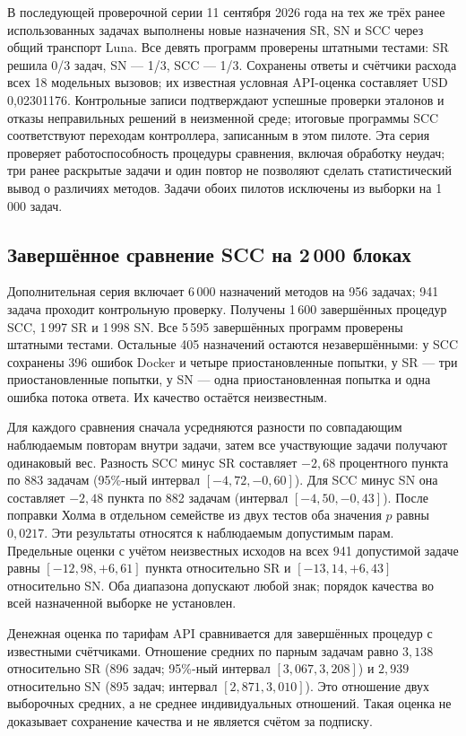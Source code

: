 В последующей проверочной серии 11 сентября 2026 года на тех же трёх ранее использованных задачах выполнены новые назначения SR, SN и SCC через общий транспорт Luna. Все девять программ проверены штатными тестами: SR решила 0/3 задач, SN --- 1/3, SCC --- 1/3. Сохранены ответы и счётчики расхода всех 18 модельных вызовов; их известная условная API-оценка составляет USD 0{,}02301176. Контрольные записи подтверждают успешные проверки эталонов и отказы неправильных решений в неизменной среде; итоговые программы SCC соответствуют переходам контроллера, записанным в этом пилоте. Эта серия проверяет работоспособность процедуры сравнения, включая обработку неудач; три ранее раскрытые задачи и один повтор не позволяют сделать статистический вывод о различиях методов. Задачи обоих пилотов исключены из выборки на 1\,000 задач.

\subsection{Завершённое сравнение SCC на 2\,000 блоках}
Дополнительная серия включает 6\,000 назначений методов на 956 задачах; 941 задача проходит контрольную проверку. Получены 1\,600 завершённых процедур SCC, 1\,997 SR и 1\,998 SN. Все 5\,595 завершённых программ проверены штатными тестами. Остальные 405 назначений остаются незавершёнными: у SCC сохранены 396 ошибок Docker и четыре приостановленные попытки, у SR --- три приостановленные попытки, у SN --- одна приостановленная попытка и одна ошибка потока ответа. Их качество остаётся неизвестным.

Для каждого сравнения сначала усредняются разности по совпадающим наблюдаемым повторам внутри задачи, затем все участвующие задачи получают одинаковый вес. Разность SCC минус SR составляет $-2{,}68$ процентного пункта по 883 задачам (95\%-ный интервал $[-4{,}72,-0{,}60]$). Для SCC минус SN она составляет $-2{,}48$ пункта по 882 задачам (интервал $[-4{,}50,-0{,}43]$). После поправки Холма в отдельном семействе из двух тестов оба значения $p$ равны $0{,}0217$. Эти результаты относятся к наблюдаемым допустимым парам. Предельные оценки с учётом неизвестных исходов на всех 941 допустимой задаче равны $[-12{,}98,+6{,}61]$ пункта относительно SR и $[-13{,}14,+6{,}43]$ относительно SN. Оба диапазона допускают любой знак; порядок качества во всей назначенной выборке не установлен.

Денежная оценка по тарифам API сравнивается для завершённых процедур с известными счётчиками. Отношение средних по парным задачам равно $3{,}138$ относительно SR (896 задач; 95\%-ный интервал $[3{,}067,3{,}208]$) и $2{,}939$ относительно SN (895 задач; интервал $[2{,}871,3{,}010]$). Это отношение двух выборочных средних, а не среднее индивидуальных отношений. Такая оценка не доказывает сохранение качества и не является счётом за подписку.

